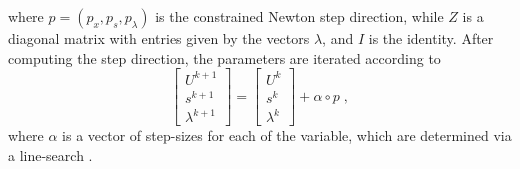 where $p = ( p_x , p_s , p_{\lambda} )$ is the constrained Newton step direction, while $Z$ is a diagonal matrix with entries given by the vectors $\lambda$, and $I$ is the identity.
After computing the step direction, the parameters are iterated according to 
\begin{equation}
\begin{bmatrix}
  U^{k+1} \\ s^{k+1} \\ \lambda^{k+1} 
\end{bmatrix} 
=
\begin{bmatrix}
  U^{k} \\ s^{k} \\ \lambda^{k} 
\end{bmatrix} 
+ \alpha \circ p \; ,
\label{eq:ConNewtonStep}
\end{equation}
where $\alpha$ is a vector of step-sizes for each of the variable, which are determined via a line-search \cite{Wachter2005,Fletcher2002}.

